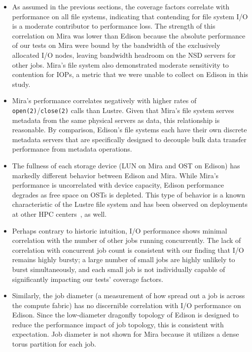 \begin{itemize}[leftmargin=*]

\item As assumed in the previous sections, the coverage factors correlate with performance on all file systems, indicating that contending for file system I/O is a moderate contributor to performance loss.
The strength of this correlation on Mira was lower than Edison because the absolute performance of our tests on Mira were bound by the bandwidth of the exclusively allocated I/O nodes, leaving bandwidth headroom on the NSD servers for other jobs.
Mira's file system also demonstrated moderate sensitivity to contention for
IOPs, a metric that we were unable to collect on Edison in this study.

\item Mira's performance correlates negatively with higher rates of \texttt{open(2)}/\texttt{close(2)} calls than Lustre.
Given that Mira's file system serves metadata from the same physical servers as data, this relationship is reasonable.
By comparison, Edison's file systems each have their own discrete metadata servers that are specifically designed to decouple bulk data transfer performance from metadata operations.

\item The fullness of each storage device (LUN on Mira and OST on Edison) has markedly different behavior between Edison and Mira.
While Mira's performance is uncorrelated with device capacity, Edison performance degrades as free space on OSTs is depleted.
This type of behavior is a known characteristic of the Lustre file system and has been observed on deployments at other HPC centers~\cite{oral2014best}, as well.

\item Perhaps contrary to historic intuition, I/O performance shows minimal correlation with the number of other jobs running concurrently.
The lack of correlation with concurrent job count is consistent with our finding that I/O remains highly bursty; a large number of small jobs are highly unlikely to burst simultaneously, and each small job is not individually capable of significantly impacting our tests' coverage factors.

\item Similarly, the job diameter (a measurement of how spread out a job is across the compute fabric) has no discernible correlation with I/O performance on Edison.
Since the low-diameter dragonfly topology of Edison is designed
to reduce the performance impact of job topology, this is consistent with
expectation.  Job diameter is not shown for Mira because it utilizes a dense
torus partition for each job.

\end{itemize}

